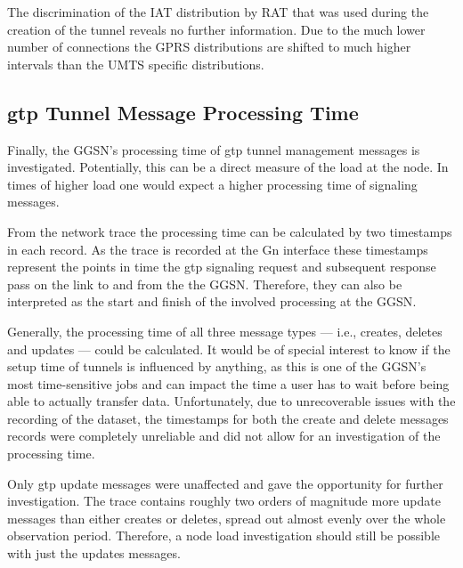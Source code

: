 The discrimination of the \gls{IAT} distribution by \gls{RAT} that was used during the creation of the tunnel reveals no further information. Due to the much lower number of connections the \gls{GPRS} distributions are shifted to much higher intervals than the \gls{UMTS} specific distributions.


\subsection{\texorpdfstring{\acrshort{gtp}}{GTP} Tunnel Message Processing Time}

Finally, the \gls{GGSN}'s processing time of \gls{gtp} tunnel management messages is investigated. Potentially, this can be a direct measure of the load at the node. In times of higher load one would expect a higher processing time of signaling messages.

From the network trace the processing time can be calculated by two timestamps in each record.
As the trace is recorded at the Gn interface these timestamps represent the points in time the \gls{gtp} signaling request and subsequent response pass on the link to and from the the \gls{GGSN}. Therefore, they can also be interpreted as the start and finish of the involved processing at the \gls{GGSN}.

Generally, the processing time of all three message types --- i.e., creates, deletes and updates --- could be calculated. It would be of special interest to know if the setup time of tunnels is influenced by anything, as this is one of the \gls{GGSN}'s most time-sensitive jobs and can impact the time a user has to wait before being able to actually transfer data. Unfortunately, due to unrecoverable issues with the recording of the dataset, the timestamps for both the create and delete messages records were completely unreliable and did not allow for an investigation of the processing time. 

Only \gls{gtp} update messages were unaffected and gave the opportunity for further investigation. The trace contains roughly two orders of magnitude more update messages than either creates or deletes, spread out almost evenly over the whole observation period. Therefore, a node load investigation should still be possible with just the updates messages.

